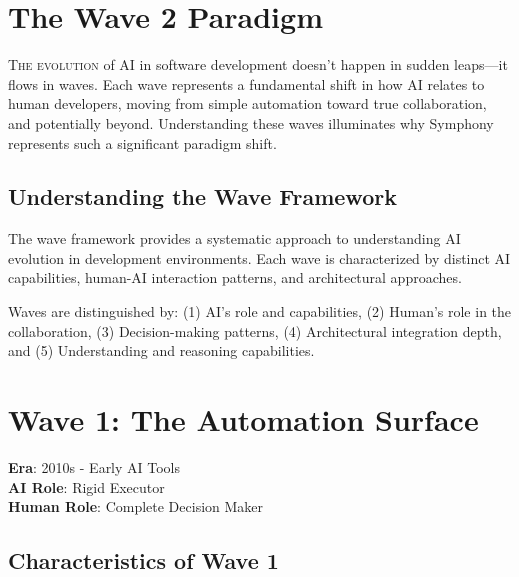 
\section{The Wave 2 Paradigm}
\label{sec:wave-paradigm}

\lettrine{T}{he evolution} of AI in software development doesn't happen in sudden leaps—it flows in waves. Each wave represents a fundamental shift in how AI relates to human developers, moving from simple automation toward true collaboration, and potentially beyond. Understanding these waves illuminates why Symphony represents such a significant paradigm shift.

\subsection{Understanding the Wave Framework}
\label{subsec:wave-framework}

The wave framework provides a systematic approach to understanding AI evolution in development environments. Each wave is characterized by distinct AI capabilities, human-AI interaction patterns, and architectural approaches.

\begin{infobox}[title=Wave Classification Criteria]
Waves are distinguished by: (1) AI's role and capabilities, (2) Human's role in the collaboration, (3) Decision-making patterns, (4) Architectural integration depth, and (5) Understanding and reasoning capabilities.
\end{infobox}

\section{Wave 1: The Automation Surface}
\label{sec:wave-1}

\textbf{Era}: 2010s - Early AI Tools\\
\textbf{AI Role}: Rigid Executor\\
\textbf{Human Role}: Complete Decision Maker

\subsection{Characteristics of Wave 1}
\label{subsec:wave-1-characteristics}

